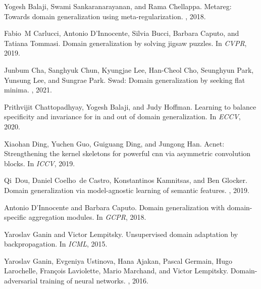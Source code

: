 \documentclass{article}
\begin{document}
\begin{thebibliography}{}

Yogesh Balaji, Swami Sankaranarayanan, and Rama Chellappa.
\newblock Metareg: Towards domain generalization using meta-regularization.
, 2018.

Fabio~M Carlucci, Antonio D'Innocente, Silvia Bucci, Barbara Caputo, and
  Tatiana Tommasi.
\newblock Domain generalization by solving jigsaw puzzles.
\newblock In {\em CVPR}, 2019.

Junbum Cha, Sanghyuk Chun, Kyungjae Lee, Han-Cheol Cho, Seunghyun Park, Yunsung
  Lee, and Sungrae Park.
\newblock Swad: Domain generalization by seeking flat minima.
, 2021.

Prithvijit Chattopadhyay, Yogesh Balaji, and Judy Hoffman.
\newblock Learning to balance specificity and invariance for in and out of
  domain generalization.
\newblock In {\em ECCV}, 2020.

Xiaohan Ding, Yuchen Guo, Guiguang Ding, and Jungong Han.
\newblock Acnet: Strengthening the kernel skeletons for powerful cnn via
  asymmetric convolution blocks.
\newblock In {\em ICCV}, 2019.

Qi~Dou, Daniel Coelho~de Castro, Konstantinos Kamnitsas, and Ben Glocker.
\newblock Domain generalization via model-agnostic learning of semantic
  features.
, 2019.

Antonio D’Innocente and Barbara Caputo.
\newblock Domain generalization with domain-specific aggregation modules.
\newblock In {\em GCPR}, 2018.

Yaroslav Ganin and Victor Lempitsky.
\newblock Unsupervised domain adaptation by backpropagation.
\newblock In {\em ICML}, 2015.

Yaroslav Ganin, Evgeniya Ustinova, Hana Ajakan, Pascal Germain, Hugo
  Larochelle, Fran{\c{c}}ois Laviolette, Mario Marchand, and Victor Lempitsky.
\newblock Domain-adversarial training of neural networks.
, 2016.


\end{thebibliography}
\end{document}
